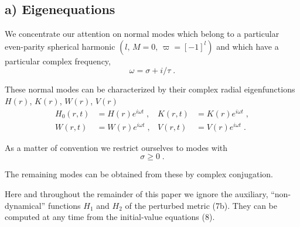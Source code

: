 
\subsection*{a) Eigenequations}

We concentrate our attention on normal modes which belong to a particular even-parity
spherical harmonic $(l,\, M = 0,\, \varpi = [-1]^{l})$ and which have a particular complex
frequency,
\begin{equation}
  \omega = \sigma + i/\tau \;.
\label{eq:11}
\end{equation}

These normal modes can be characterized by their complex radial eigenfunctions $H(r)$,
$K(r)$, $W(r)$, $V(r)$
\begin{equation}
  \begin{aligned}
    H_{0}(r,t) &= H(r)e^{i\omega t} \;, & K(r,t) &= K(r)e^{i\omega t} \;, \\
    W(r,t)     &= W(r)e^{i\omega t} \;, & V(r,t) &= V(r)e^{i\omega t} \;.
  \end{aligned}
\label{eq:12}
\end{equation}

As a matter of convention we restrict ourselves to modes with
\begin{equation}
  \sigma \geq 0 \;.
\label{eq:13}
\end{equation}

The remaining modes can be obtained from these by complex conjugation.

Here and throughout the remainder of this paper we ignore the auxiliary,
``non-dynamical'' functions $H_{1}$ and $H_{2}$ of the perturbed metric (7b). They can be
computed at any time from the initial-value equations (8).

